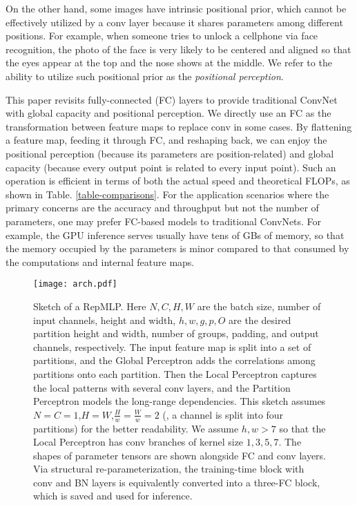 \documentclass[10pt,twocolumn,letterpaper]{article}
\begin{document}
On the other hand, some images have intrinsic positional prior, which cannot be effectively utilized by a conv layer because it shares parameters among different positions. For example, when someone tries to unlock a cellphone via face recognition, the photo of the face is very likely to be centered and aligned so that the eyes appear at the top and the nose shows at the middle. We refer to the ability to utilize such positional prior as the \textit{positional perception}.

This paper revisits fully-connected (FC) layers to provide traditional ConvNet with global capacity and positional perception. We directly use an FC as the transformation between feature maps to replace conv in some cases. By flattening a feature map, feeding it through FC, and reshaping back, we can enjoy the positional perception (because its parameters are position-related) and global capacity (because every output point is related to every input point). Such an operation is efficient in terms of both the actual speed and theoretical FLOPs, as shown in Table. \ref{table-comparisons}. For the application scenarios where the primary concerns are the accuracy and throughput but not the number of parameters, one may prefer FC-based models to traditional ConvNets. For example, the GPU inference serves usually have tens of GBs of memory, so that the memory occupied by the parameters is minor compared to that consumed by the computations and internal feature maps.
\begin{figure*}
	\begin{center}
		\texttt{[image: arch.pdf]}
		\vspace{-0.25in}
		\caption{Sketch of a RepMLP. Here $N,C,H,W$ are the batch size, number of input channels, height and width, $h,w,g,p,O$ are the desired partition height and width, number of groups, padding, and output channels, respectively. The input feature map is split into a set of partitions, and the Global Perceptron adds the correlations among partitions onto each partition. Then the Local Perceptron captures the local patterns with several conv layers, and the Partition Perceptron models the long-range dependencies. This sketch assumes $N=C=1$,$H=W$,$\frac{H}{w}=\frac{W}{w}=2$ (\ie, a channel is split into four partitions) for the better readability. We assume $h,w>7$ so that the Local Perceptron has conv branches of kernel size $1,3,5,7$. The shapes of parameter tensors are shown alongside FC and conv layers. Via structural re-parameterization, the training-time block with conv and BN layers is equivalently converted into a three-FC block, which is saved and used for inference.}
		\label{fig-arch}
		\vspace{-0.25in}
	\end{center}
\end{figure*}
\end{document}
